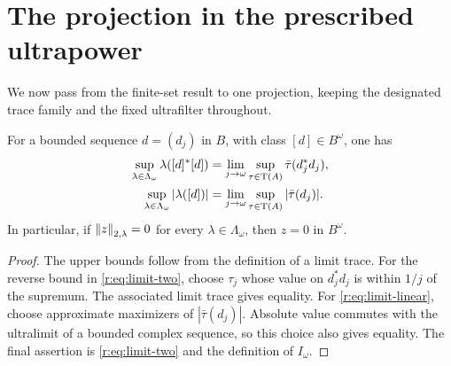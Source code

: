 \section{The projection in the prescribed ultrapower}\label{r:sec:completion}

We now pass from the finite-set result to one projection, keeping the
designated trace family and the fixed ultrafilter throughout.

\begin{lemma}\label{r:completion:detection}
For a bounded sequence \(d=(d_j)\) in \(B\), with class
\([d]\in B^\omega\), one has
\begin{align}
 \sup_{\lambda\in\Lambda_\omega}\lambda([d]^*[d])
 &=\lim_{j\to\omega}\sup_{\tau\in\operatorname T(A)}
             \bar\tau(d_j^*d_j),\label{r:eq:limit-two}\\
 \sup_{\lambda\in\Lambda_\omega}|\lambda([d])|
 &=\lim_{j\to\omega}\sup_{\tau\in\operatorname T(A)}
             |\bar\tau(d_j)|.\label{r:eq:limit-linear}
\end{align}
In particular, if \(\left\|z\right\|_{2,\lambda}=0\) for every
\(\lambda\in\Lambda_\omega\), then \(z=0\) in \(B^\omega\).
\end{lemma}

\begin{proof}
The upper bounds follow from the definition of a limit trace.
For the reverse bound in \eqref{r:eq:limit-two}, choose \(\tau_j\) whose
value on \(d_j^*d_j\) is within \(1/j\) of the supremum.
The associated limit trace gives equality.
For \eqref{r:eq:limit-linear}, choose approximate maximizers of
\(|\bar\tau(d_j)|\). Absolute value commutes with the ultralimit of a
bounded complex sequence, so this choice also gives equality.
The final assertion is \eqref{r:eq:limit-two} and the definition of
\(I_\omega\).
\end{proof}

